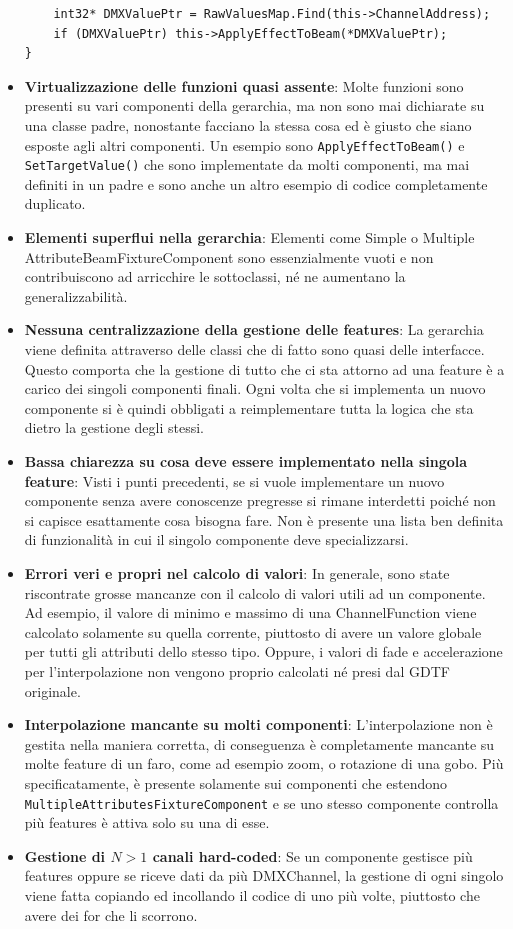 \documentclass[main.tex]{subfiles}
\begin{document}
\begin{itemize}
\begin{lstlisting}
	int32* DMXValuePtr = RawValuesMap.Find(this->ChannelAddress);
	if (DMXValuePtr) this->ApplyEffectToBeam(*DMXValuePtr);
}
\end{lstlisting}
    \item \textbf{Virtualizzazione delle funzioni quasi assente}: Molte funzioni sono presenti su vari componenti della gerarchia, ma non sono mai dichiarate su una classe padre, nonostante facciano la stessa cosa ed è giusto che siano esposte agli altri componenti. Un esempio sono \lstinline{ApplyEffectToBeam()} e \lstinline{SetTargetValue()} che sono implementate da molti componenti, ma mai definiti in un padre e sono anche un altro esempio di codice completamente duplicato.
    \item \textbf{Elementi superflui nella gerarchia}: Elementi come Simple o Multiple AttributeBeamFixtureComponent sono essenzialmente vuoti e non contribuiscono ad arricchire le sottoclassi, né ne aumentano la generalizzabilità.
    \item \textbf{Nessuna centralizzazione della gestione delle features}: La gerarchia viene definita attraverso delle classi che di fatto sono quasi delle interfacce. Questo comporta che la gestione di tutto che ci sta attorno ad una feature è a carico dei singoli componenti finali. Ogni volta che si implementa un nuovo componente si è quindi obbligati a reimplementare tutta la logica che sta dietro la gestione degli stessi.
    \item \textbf{Bassa chiarezza su cosa deve essere implementato nella singola feature}: Visti i punti precedenti, se si vuole implementare un nuovo componente senza avere conoscenze pregresse si rimane interdetti poiché non si capisce esattamente cosa bisogna fare. Non è presente una lista ben definita di funzionalità in cui il singolo componente deve specializzarsi.
    \item \textbf{Errori veri e propri nel calcolo di valori}: In generale, sono state riscontrate grosse mancanze con il calcolo di valori utili ad un componente. Ad esempio, il valore di minimo e massimo di una ChannelFunction viene calcolato solamente su quella corrente, piuttosto di avere un valore globale per tutti gli attributi dello stesso tipo. Oppure, i valori di fade e accelerazione per l'interpolazione non vengono proprio calcolati né presi dal GDTF originale.
    \item \textbf{Interpolazione mancante su molti componenti}: L'interpolazione non è gestita nella maniera corretta, di conseguenza è completamente mancante su molte feature di un faro, come ad esempio zoom, o rotazione di una gobo. Più specificatamente, è presente solamente sui componenti che estendono \lstinline{MultipleAttributesFixtureComponent} e se uno stesso componente controlla più features è attiva solo su una di esse.
    \item \textbf{Gestione di $N > 1$ canali hard-coded}: Se un componente gestisce più features oppure se riceve dati da più DMXChannel, la gestione di ogni singolo viene fatta copiando ed incollando il codice di uno più volte, piuttosto che avere dei for che li scorrono.
\end{itemize}
\end{document}
